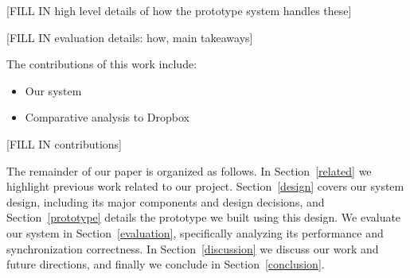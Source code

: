 [FILL IN high level details of how the prototype system handles these]

[FILL IN evaluation details: how, main takeaways]

The contributions of this work include:
\begin{itemize}
\item Our system
\item Comparative analysis to Dropbox
\end{itemize}
[FILL IN contributions]

The remainder of our paper is organized as follows.
In Section~\ref{related} we highlight previous work related to our project.
Section~\ref{design} covers our system design, including
its major components and design decisions,
and Section~\ref{prototype} details the prototype we built using this design.
We evaluate our system in Section~\ref{evaluation}, specifically
analyzing its performance and synchronization correctness.
In Section~\ref{discussion} we discuss our work and future directions,
and finally we conclude in Section~\ref{conclusion}.
